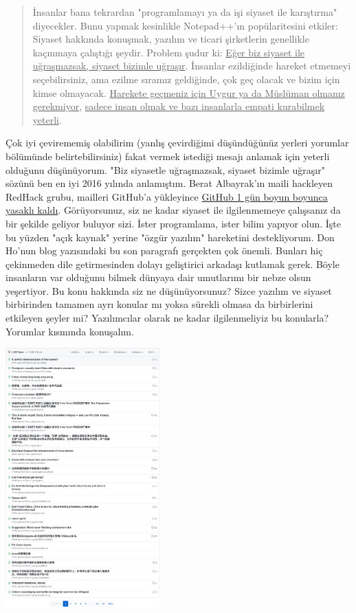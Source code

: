 \documentclass[11pt]{article}
\begin{document}
\begin{quote}
İnsanlar bana tekrardan "programlamayı ya da işi siyaset ile karıştırma"
diyecekler. Bunu yapmak kesinlikle Notepad++'ın popülaritesini etkiler: Siyaset
hakkında konuşmak, yazılım ve ticari şirketlerin genellikle kaçınmaya çalıştığı
şeydir. Problem şudur ki: \uline{Eğer biz siyaset ile uğraşmazsak, siyaset bizimle
uğraşır}. İnsanlar ezildiğinde hareket etmemeyi seçebilirsiniz, ama ezilme
sıramız geldiğinde, çok geç olacak ve bizim için kimse olmayacak. \uline{Harekete
geçmeniz için Uygur ya da Müslüman olmanız gerekmiyor},
\uline{sadece insan olmak ve bazı insanlarla empati kurabilmek yeterli}.
\end{quote}

Çok iyi çevirememiş olabilirim (yanlış çevirdiğimi düşündüğünüz yerleri
yorumlar bölümünde belirtebilirsiniz) fakat vermek istediği mesajı anlamak için
yeterli olduğunu düşünüyorum. "Biz siyasetle uğraşmazsak, siyaset bizimle
uğraşır" sözünü ben en iyi 2016 yılında anlamıştım. Berat Albayrak'ın maili
hackleyen RedHack grubu, mailleri GitHub'a yükleyince \href{https://teknoseyir.com/durum/1155906}{GitHub 1 gün boyun
boyunca yasaklı kaldı}. Görüyorsunuz, siz ne kadar siyaset ile ilgilenmemeye
çalışsanız da bir şekilde geliyor buluyor sizi. İster programlama, ister bilim
yapıyor olun. İşte bu yüzden "açık kaynak" yerine "özgür yazılım" hareketini
destekliyorum. Don Ho'nun blog yazısındaki bu son paragrafı gerçekten çok
önemli. Bunları hiç çekinmeden dile getirmesinden dolayı geliştirici arkadaşı
kutlamak gerek. Böyle insanların var olduğunu bilmek dünyaya dair umutlarımı
bir nebze olsun yeşertiyor. Bu konu hakkında siz ne düşünüyorsunuz? Sizce
yazılım ve siyaset birbirinden tamamen ayrı konular mı yoksa sürekli olmasa da
birbirlerini etkileyen şeyler mi? Yazılımcılar olarak ne kadar ilgilenmeliyiz
bu konularla? Yorumlar kısmında konuşalım.

\begin{center}
\includegraphics[height=10cm]{gorseller/notepadpp-issues-spam.png}
\end{center}
\end{document}
